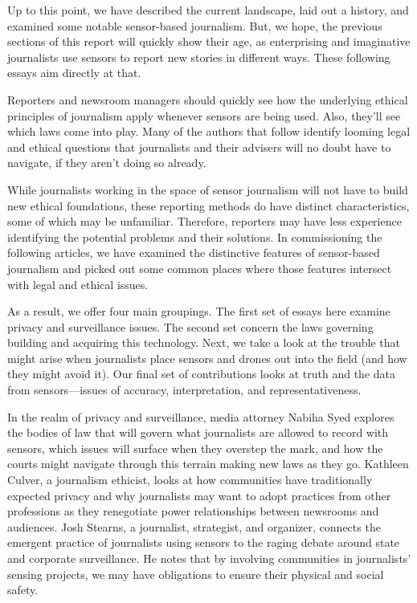 Up to this point, we have described the current landscape, laid out a history,
and examined some notable sensor-based journalism. But, we hope,
the previous sections of this report will quickly show their age, as enterprising
and imaginative journalists use sensors to report new stories in different
ways. These following essays aim directly at that.

Reporters and newsroom managers should quickly see how the underlying
ethical principles of journalism apply whenever sensors are being used.
Also, they'll see which laws come into play. Many of the authors that follow
identify looming legal and ethical questions that journalists and their advisers
will no doubt have to navigate, if they aren't doing so already.

While journalists working in the space of sensor journalism will not have
to build new ethical foundations, these reporting methods do have distinct
characteristics, some of which may be unfamiliar. Therefore, reporters may
have less experience identifying the potential problems and their solutions.
In commissioning the following articles, we have examined the distinctive
features of sensor-based journalism and picked out some common places
where those features intersect with legal and ethical issues.

As a result, we offer four main groupings. The first set of essays here examine
privacy and surveillance issues. The second set concern the laws governing
building and acquiring this technology. Next, we take a look at the
trouble that might arise when journalists place sensors and drones out into the field (and how they might avoid it). Our final set of contributions looks at truth and the data from sensors—issues of accuracy, interpretation, and
representativeness.

In the realm of privacy and surveillance, media attorney Nabiha Syed
explores the bodies of law that will govern what journalists are allowed to
record with sensors, which issues will surface when they overstep the mark,
and how the courts might navigate through this terrain making new laws as
they go. Kathleen Culver, a journalism ethicist, looks at how communities
have traditionally expected privacy and why journalists may want to adopt
practices from other professions as they renegotiate power relationships
between newsrooms and audiences. Josh Stearns, a journalist, strategist,
and organizer, connects the emergent practice of journalists using sensors
to the raging debate around state and corporate surveillance. He notes that
by involving communities in journalists' sensing projects, we may have obligations
to ensure their physical and social safety.

